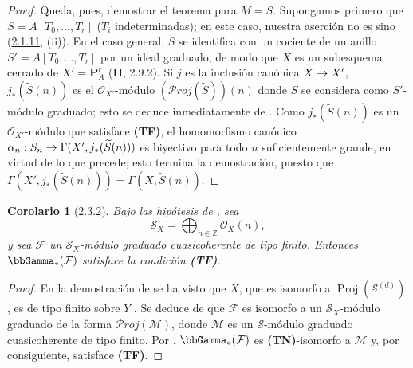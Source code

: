 \documentclass[10pt,oneside,openany]{book}
\theoremstyle{egaenv}\newtheorem*{env}{---}
\theoremstyle{egastatement}
\newtheorem*{corollary}{Corolario}
\theoremstyle{egadescription}
\providecommand{\shProj}{\mathcal{P}\!\mathit{roj}}
\renewcommand{\to}{\mathchoice{\longrightarrow}{\rightarrow}{\rightarrow}{\rightarrow}}
\begin{document}
\begin{proof}
Queda, pues, demostrar el teorema para $M=S$.
Supongamos primero que
$S=A[T_0,\ldots,T_r]$ ($T_i$ indeterminadas); en este caso, nuestra aserción no es sino (\hyperref[III.2.1.11-fr]{2.1.11}, (ii)). En el caso general, $S$ se identifica con un cociente de un anillo
$S'=A[T_0,\ldots,T_r]$
por un ideal graduado, de modo que $X$ es un subesquema cerrado de
$X'=\mathbf P_A^r$ (\textbf{II}, 2.9.2). Si $j$ es la inclusión canónica
$X\to X'$, $j_*(\widetilde S(n))$ es el $\mathcal O_{X'}$-módulo
$(\shProj(\widetilde S))(n)$
donde $S$ se considera como $S'$-módulo graduado; esto se deduce inmediatamente de .
Como $j_*(\widetilde S(n))$ es un $\mathcal O_{X'}$-módulo que satisface \textbf{(TF)}, el homomorfismo canónico
$\alpha_n:S_n\to\Gamma(X',j_*(\widetilde S(n)))$
es biyectivo para todo $n$ suficientemente grande, en virtud de lo que precede; esto termina la demostración, puesto que $\Gamma(X',j_*(\widetilde S(n)))=\Gamma(X,\widetilde S(n))$.
\end{proof}

\begin{corollary}[2.3.2]
\label{III.2.3.2}
\label{III.2.3.2-fr}
Bajo las hipótesis de \textup{}, sea
\[
\mathcal S_X=\bigoplus_{n\in\mathbb Z}\mathcal O_X(n),
\]
y sea $\mathcal F$ un $\mathcal S_X$-módulo graduado cuasicoherente de tipo finito.
Entonces $\bbGamma_*(\mathcal F)$ satisface la condición \textup{\textbf{(TF)}}.
\end{corollary}

\begin{proof}
En la demostración de  se ha visto que $X$, que es isomorfo a $\operatorname{Proj}(\mathcal S^{(d)})$ , es de tipo finito sobre $Y$ .
Se deduce de  que $\mathcal F$ es isomorfo a un $\mathcal S_X$-módulo graduado de la forma $\shProj(\mathcal M)$, donde $\mathcal M$ es un $\mathcal S$-módulo graduado cuasicoherente de tipo finito.
Por , $\bbGamma_*(\mathcal F)$ es \textbf{(TN)}-isomorfo a $\mathcal M$ y, por consiguiente, satisface \textbf{(TF)}.
\end{proof}
\end{document}
